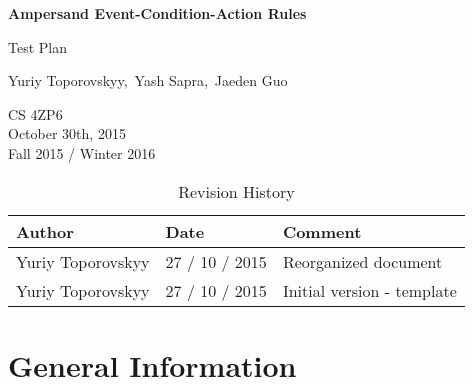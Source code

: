 \documentclass[12pt]{report}
\begin{document}
\begin{titlepage}\begin{center}
\thispagestyle{empty} %

\vspace*{1cm}

{\Huge\textbf{Ampersand Event-Condition-Action Rules}}

\vspace{0.5cm}
{\Large Test Plan

\vspace{1.5cm}
Yuriy Toporovskyy,\ Yash Sapra,\ Jaeden Guo}
\vfill 


\end{center}
CS 4ZP6 \\
October 30th, 2015 \\ 
Fall 2015 / Winter 2016 
\end{titlepage}


\begin{table}[ht!]\begin{center}
\caption{Revision History}  
\begin{tabular}{|l|l|l|}\hline
\textbf{Author} & \textbf{Date} & \textbf{Comment} \\\hline 
Yuriy Toporovskyy & 27 / 10 / 2015 & Reorganized document \\\hline
Yuriy Toporovskyy & 27 / 10 / 2015 & Initial version - template \\\hline
\end{tabular}
\end{center}\end{table}

\newpage

\tableofcontents
\listoffigures
\listoftables

\newpage
{} %

%
%

\chapter{General Information}
\end{document}
